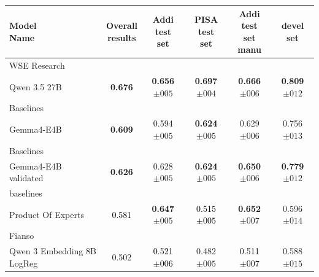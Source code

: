 \begin{tabularx}{\textwidth}{X | c c c c c}
\hline
\makecell[b]{\textbf{Model} \\ \textbf{Name}} & \makecell[b]{\textbf{Overall} \\ \textbf{results}} & \makecell[b]{\textbf{Addi} \\ \textbf{test} \\ \textbf{set}} & \makecell[b]{\textbf{PISA} \\ \textbf{test} \\ \textbf{set}} & \makecell[b]{\textbf{Addi} \\ \textbf{test} \\ \textbf{set} \\ \textbf{manu}} & \makecell[b]{\textbf{devel} \\ \textbf{set}} \\
\hline
WSE Research\\\subcatarrow{}Qwen 3.5 27B & \textbf{\textcolor{BrickRed}{0.676}} & \textbf{\textcolor{BrickRed}{0.656$\pm{}005$}} & \textbf{\textcolor{BrickRed}{0.697$\pm{}004$}} & \textbf{\textcolor{BrickRed}{0.666$\pm{}006$}} & \textbf{\textcolor{White!50!BrickRed}{0.809$\pm{}012$}} \\
Baselines\\\subcatarrow{}Gemma4-E4B & \textbf{\textcolor{White!50!BrickRed}{0.609}} & \textcolor{White!50!BrickRed}{0.594$\pm{}005$} & \textbf{\textcolor{White!50!BrickRed}{0.624$\pm{}005$}} & \textcolor{BrickRed}{0.629$\pm{}006$} & \textcolor{White!50!BrickRed}{0.756$\pm{}013$} \\
Baselines\\\subcatarrow{}Gemma4-E4B validated & \textbf{\textcolor{White!50!BrickRed}{0.626}} & \textcolor{BrickRed}{0.628$\pm{}005$} & \textbf{\textcolor{White!50!BrickRed}{0.624$\pm{}005$}} & \textbf{\textcolor{BrickRed}{0.650$\pm{}006$}} & \textbf{\textcolor{White!50!BrickRed}{0.779$\pm{}012$}} \\
baselines\\\subcatarrow{}Product Of Experts & \textcolor{Black}{0.581} & \textbf{\textcolor{BrickRed}{0.647$\pm{}005$}} & \textcolor{Black}{0.515$\pm{}005$} & \textbf{\textcolor{BrickRed}{0.652$\pm{}007$}} & \textcolor{White!50!NavyBlue}{0.596$\pm{}014$} \\
Fianso\\\subcatarrow{}Qwen 3 Embedding 8B LogReg & \textcolor{White!50!NavyBlue}{0.502} & \textcolor{Black}{0.521$\pm{}006$} & \textcolor{White!50!NavyBlue}{0.482$\pm{}005$} & \textcolor{Black}{0.511$\pm{}007$} & \textcolor{White!50!NavyBlue}{0.588$\pm{}015$} \\

\end{tabularx}
